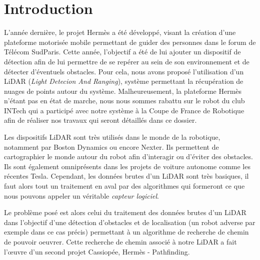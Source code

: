 \section*{Introduction}

\tab L'année dernière, le projet Hermès a été développé, visant la création d'une plateforme motorisée mobile permettant de guider des personnes dans le forum de Télécom SudParis. Cette année, l'objectif a été de lui ajouter un dispositif de détection afin de lui permettre de se repérer au sein de son environnement et de détecter d'éventuels obstacles. Pour cela, nous avons proposé l'utilisation d'un LiDAR (\textit{Light Detecion And Ranging}), système permettant la récupération de nuages de points autour du système. Malheureusement, la plateforme Hermès n'étant pas en état de marche, nous nous sommes rabattu sur le robot du club INTech qui a participé avec notre système à la Coupe de France de Robotique afin de réaliser nos travaux qui seront détaillés dans ce dossier.

\tab Les dispositifs LiDAR sont très utilisés dans le monde de la robotique, notamment par Boston Dynamics ou encore Nexter. Ils permettent de cartographier le monde autour du robot afin d'interagir ou d'éviter des obstacles. Ils sont également omniprésents dans les projets de voiture autonome comme les récentes Tesla. Cependant, les données brutes d'un LiDAR sont très basiques, il faut alors tout un traitement en aval par des algorithmes qui formeront ce que nous pouvons appeler un véritable \textit{capteur logiciel}.

\tab Le problème posé est alors celui du traitement des données brutes d'un LiDAR dans l'objectif d'une détection d'obstacles et de localisation (un robot adverse par exemple dans ce cas précis) permettant à un algorithme de recherche de chemin de pouvoir oeuvrer. Cette recherche de chemin associé à notre LiDAR a fait l’œuvre d'un second projet Cassiopée, Hermès - Pathfinding.